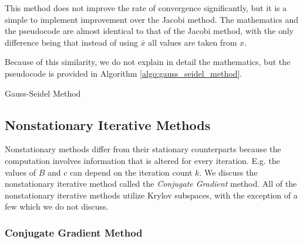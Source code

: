 \documentclass[../fem.tex]{subfile}
\begin{document}
This method does not improve the rate of convergence significantly, but it is a
simple to implement improvement over the Jacobi method. The mathematics and the
pseudocode are almost identical to that of the Jacobi method, with the only
difference being that instead of using $\bar{x}$ all values are taken from $x$.

%      

Because of this similarity, we do not explain in detail the mathematics, but the
pseudocode is provided in Algorithm \ref{algo:gauss_seidel_method}.

\begin{algorithm}[H]
  \caption{Gauss-Seidel Method}\label{algo:gauss_seidel_method}
  \begin{algorithmic}
    \EndFor
    \EndFor
    \EndIf
    \EndFor
  \end{algorithmic}
\end{algorithm}

\subsection{Nonstationary Iterative Methods}%
\label{sub:nonstationary_iterative_methods}

Nonstationary methods differ from their stationary counterparts because the
computation involves information that is altered for every iteration. E.g. the
values of $B$ and $c$ can depend on the iteration count $k$. We discuss the
nonstationary iterative method called the  \textit{Conjugate Gradient} method.
All of the nonstationary iterative methods utilize Krylov subspaces, with the
exception of a few which we do not discuss.

\subsubsection{Conjugate Gradient Method}%
\label{ssub:conjugate_gradient_method}
\end{document}
